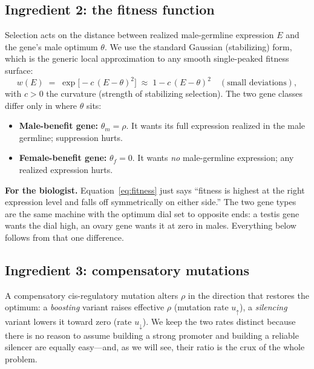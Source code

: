 \documentclass[11pt,a4paper]{article}
\begin{document}
\subsection{Ingredient 2: the fitness function}

Selection acts on the distance between realized male-germline expression $E$ and the gene's male optimum $\theta$. We use the standard Gaussian (stabilizing) form, which is the generic local approximation to any smooth single-peaked fitness surface:
\begin{equation}
w(E) \;=\; \exp\!\big[-c\,(E-\theta)^2\big] \;\approx\; 1 - c\,(E-\theta)^2 \quad (\text{small deviations}),
\label{eq:fitness}
\end{equation}
with $c>0$ the curvature (strength of stabilizing selection). The two gene classes differ only in where $\theta$ sits:
\begin{itemize}
\item \textbf{Male-benefit gene:} $\theta_m = \rho$. It wants its full expression realized in the male germline; suppression hurts.
\item \textbf{Female-benefit gene:} $\theta_f = 0$. It wants \emph{no} male-germline expression; any realized expression hurts.
\end{itemize}

\begin{checkpoint}
\textbf{For the biologist.} Equation~\eqref{eq:fitness} just says ``fitness is highest at the right expression level and falls off symmetrically on either side.'' The two gene types are the same machine with the optimum dial set to opposite ends: a testis gene wants the dial high, an ovary gene wants it at zero in males. Everything below follows from that one difference.
\end{checkpoint}

\subsection{Ingredient 3: compensatory mutations}

A compensatory cis-regulatory mutation alters $\rho$ in the direction that restores the optimum: a \emph{boosting} variant raises effective $\rho$ (mutation rate $u_{\uparrow}$), a \emph{silencing} variant lowers it toward zero (rate $u_{\downarrow}$). We keep the two rates distinct because there is no reason to assume building a strong promoter and building a reliable silencer are equally easy---and, as we will see, their ratio is the crux of the whole problem.
\end{document}
